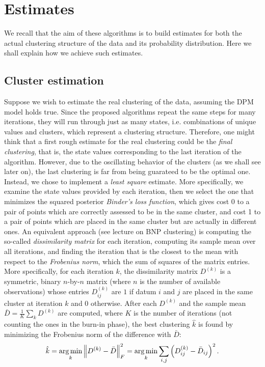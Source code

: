 \chapter{Estimates}
We recall that the aim of these algorithms is to build estimates for both the actual clustering structure of the data and its probability distribution.
Here we shall explain how we achieve such estimates.
\section{Cluster estimation}
Suppose we wish to estimate the real clustering of the data, assuming the DPM model holds true.
Since the proposed algorithms repeat the same steps for many iterations, they will run through just as many states, i.e. combinations of unique values and clusters, which represent a clustering structure.
Therefore, one might think that a first rough estimate for the real clustering could be the \emph{final clustering}, that is, the state values corresponding to the last iteration of the algorithm.
However, due to the oscillating behavior of the clusters (as we shall see later on), the last clustering is far from being guarateed to be the optimal one.
Instead, we chose to implement a \emph{least square} estimate.
More specifically, we examine the state values provided by each iteration, then we select the one that minimizes the squared posterior \emph{Binder's loss function}, which gives cost 0 to a pair of points which are correctly assessed to be in the same cluster, and cost 1 to a pair of points which are placed in the same cluster but are actually in different ones.
An equivalent approach (see \cite{beep} lecture on BNP clustering) is computing the so-called \emph{dissimilarity matrix} for each iteration, computing its sample mean over all iterations, and finding the iteration that is the closest to the mean with respect to the \emph{Frobenius norm}, which the sum of squares of the matrix entries. 
More specifically, for each iteration $k$, the dissimilarity matrix $D^{(k)}$ is a symmetric, binary $n$-by-$n$ matrix (where $n$ is the number of available observations) whose entries $D^{(k)}_{ij}$ are $1$ if datum $i$ and $j$ are placed in the same cluster at iteration $k$ and $0$ otherwise.
After each $D^{(k)}$ and the sample mean $\bar{D} = \frac{1}{K} \sum_k D^{(k)}$ are computed, where $K$ is the number of iterations (not counting the ones in the burn-in phase), the best clustering $\hat{k}$ is found by minimizing the Frobenius norm of the difference with $\bar{D}$:
$$
\hat{k} = \operatorname*{arg\,min}_k \left\lVert D^{(k)} - \bar D \right\rVert_F^2 = \operatorname*{arg\,min}_k \sum_{i,j} \left( D^{(k)}_{ij} - \bar{D}_{ij} \right)^2.
$$

